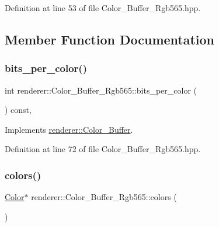 Definition at line 53 of file Color\+\_\+\+Buffer\+\_\+\+Rgb565.\+hpp.



\subsection{Member Function Documentation}
\mbox{\label{classrenderer_1_1_color___buffer___rgb565_a71920b761aa6ce5b05c1e587c168a6d4}} 
\subsubsection{\texorpdfstring{bits\_per\_color()}{bits\_per\_color()}}
{\footnotesize\ttfamily int renderer\+::\+Color\+\_\+\+Buffer\+\_\+\+Rgb565\+::bits\+\_\+per\+\_\+color (\begin{DoxyParamCaption}{ }\end{DoxyParamCaption}) const\hspace{0.3cm}{\ttfamily [inline]}, {\ttfamily [virtual]}}



Implements \mbox{\hyperlink{classrenderer_1_1_color___buffer_ac03bd34681ed79f8b36c9c7292db98e4}{renderer\+::\+Color\+\_\+\+Buffer}}.



Definition at line 72 of file Color\+\_\+\+Buffer\+\_\+\+Rgb565.\+hpp.

\mbox{\label{classrenderer_1_1_color___buffer___rgb565_aa209340b48cd679650f5965caef8dd76}} 
\subsubsection{\texorpdfstring{colors()}{colors()}\hspace{0.1cm}{\footnotesize\ttfamily [1/2]}}
{\footnotesize\ttfamily \mbox{\hyperlink{structrenderer_1_1_color___buffer___rgb565_1_1_color}{Color}}$\ast$ renderer\+::\+Color\+\_\+\+Buffer\+\_\+\+Rgb565\+::colors (\begin{DoxyParamCaption}{ }\end{DoxyParamCaption})\hspace{0.3cm}{\ttfamily [inline]}}



